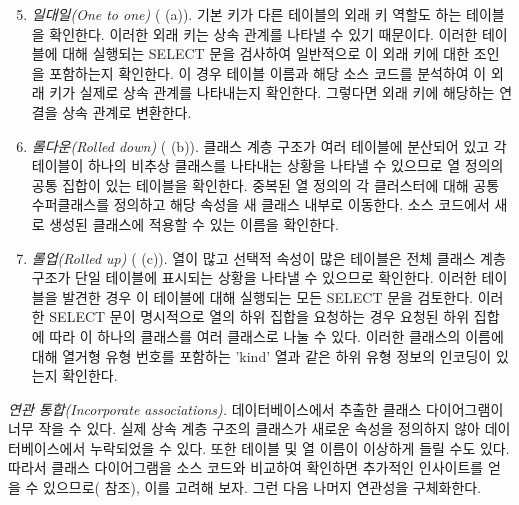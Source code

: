 \documentclass[a4paper,10pt,twoside]{book}
\begin{document}
\begin{enumerate}\setcounter{enumi}{4}
  \item \emph{일대일(One to one)} ( (a)). 기본 키가 다른 테이블의 외래 키 역할도 하는 테이블을 확인한다. 이러한 외래 키는 상속 관계를 나타낼 수 있기 때문이다. 이러한 테이블에 대해 실행되는 SELECT 문을 검사하여 일반적으로 이 외래 키에 대한 조인을 포함하는지 확인한다. 이 경우 테이블 이름과 해당 소스 코드를 분석하여 이 외래 키가 실제로 상속 관계를 나타내는지 확인한다. 그렇다면 외래 키에 해당하는 연결을 상속 관계로 변환한다.

  \item \emph{롤다운(Rolled down)} ( (b)). 클래스 계층 구조가 여러 테이블에 분산되어 있고 각 테이블이 하나의 비추상 클래스를 나타내는 상황을 나타낼 수 있으므로 열 정의의 공통 집합이 있는 테이블을 확인한다. 중복된 열 정의의 각 클러스터에 대해 공통 수퍼클래스를 정의하고 해당 속성을 새 클래스 내부로 이동한다. 소스 코드에서 새로 생성된 클래스에 적용할 수 있는 이름을 확인한다.

  \item \emph{롤업(Rolled up)} ( (c)). 열이 많고 선택적 속성이 많은 테이블은 전체 클래스 계층 구조가 단일 테이블에 표시되는 상황을 나타낼 수 있으므로 확인한다. 이러한 테이블을 발견한 경우 이 테이블에 대해 실행되는 모든 SELECT 문을 검토한다. 이러한 SELECT 문이 명시적으로 열의 하위 집합을 요청하는 경우 요청된 하위 집합에 따라 이 하나의 클래스를 여러 클래스로 나눌 수 있다. 이러한 클래스의 이름에 대해 열거형 유형 번호를 포함하는 'kind' 열과 같은 하위 유형 정보의 인코딩이 있는지 확인한다.

\end{enumerate}

\noindent
\emph{연관 통합(Incorporate associations).}
데이터베이스에서 추출한 클래스 다이어그램이 너무 작을 수 있다. 실제 상속 계층 구조의 클래스가 새로운 속성을 정의하지 않아 데이터베이스에서 누락되었을 수 있다. 또한 테이블 및 열 이름이 이상하게 들릴 수도 있다. 따라서 클래스 다이어그램을 소스 코드와 비교하여 확인하면 추가적인 인사이트를 얻을 수 있으므로( 참조), 이를 고려해 보자. 그런 다음 나머지 연관성을 구체화한다.
\end{document}
